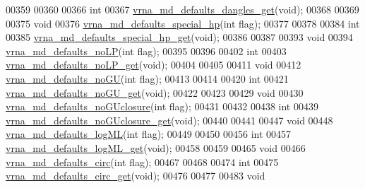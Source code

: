 \begin{DoxyCode}
00359 
00360 
00366 \textcolor{keywordtype}{int}
00367 \mbox{\hyperlink{group__model__details_ga67ca06f95ae133778c79a4493c9817b8}{vrna\_md\_defaults\_dangles\_get}}(\textcolor{keywordtype}{void});
00368 
00369 
00375 \textcolor{keywordtype}{void}
00376 \mbox{\hyperlink{group__model__details_gafff6449a02744add0308e653230c15fc}{vrna\_md\_defaults\_special\_hp}}(\textcolor{keywordtype}{int} flag);
00377 
00378 
00384 \textcolor{keywordtype}{int}
00385 \mbox{\hyperlink{group__model__details_ga1d68a6efdaa1253cc63fd9cd06452559}{vrna\_md\_defaults\_special\_hp\_get}}(\textcolor{keywordtype}{void});
00386 
00387 
00393 \textcolor{keywordtype}{void}
00394 \mbox{\hyperlink{group__model__details_ga2f88ffc393ac9d7987849c965fd29ea8}{vrna\_md\_defaults\_noLP}}(\textcolor{keywordtype}{int} flag);
00395 
00396 
00402 \textcolor{keywordtype}{int}
00403 \mbox{\hyperlink{group__model__details_ga934344888fbacaed538bbbfe910f2aa6}{vrna\_md\_defaults\_noLP\_get}}(\textcolor{keywordtype}{void});
00404 
00405 
00411 \textcolor{keywordtype}{void}
00412 \mbox{\hyperlink{group__model__details_ga98218f85c7a957a1d1ddf4627fdf5a39}{vrna\_md\_defaults\_noGU}}(\textcolor{keywordtype}{int} flag);
00413 
00414 
00420 \textcolor{keywordtype}{int}
00421 \mbox{\hyperlink{group__model__details_ga5faa7d4e536d7fe36ec25428c0cf2563}{vrna\_md\_defaults\_noGU\_get}}(\textcolor{keywordtype}{void});
00422 
00423 
00429 \textcolor{keywordtype}{void}
00430 \mbox{\hyperlink{group__model__details_gade5b9951d71ca2fb357a4e6c0c18ccd1}{vrna\_md\_defaults\_noGUclosure}}(\textcolor{keywordtype}{int} flag);
00431 
00432 
00438 \textcolor{keywordtype}{int}
00439 \mbox{\hyperlink{group__model__details_ga4f7fdad083243a5348d63320ddaa70f3}{vrna\_md\_defaults\_noGUclosure\_get}}(\textcolor{keywordtype}{void});
00440 
00441 
00447 \textcolor{keywordtype}{void}
00448 \mbox{\hyperlink{group__model__details_ga3de50a73455d88c3957386933b8e1f90}{vrna\_md\_defaults\_logML}}(\textcolor{keywordtype}{int} flag);
00449 
00450 
00456 \textcolor{keywordtype}{int}
00457 \mbox{\hyperlink{group__model__details_ga93f04e070d529c5d0bb87c9681f6ad29}{vrna\_md\_defaults\_logML\_get}}(\textcolor{keywordtype}{void});
00458 
00459 
00465 \textcolor{keywordtype}{void}
00466 \mbox{\hyperlink{group__model__details_ga4e1deb3e91a8a99e5c6dd905a5eb0186}{vrna\_md\_defaults\_circ}}(\textcolor{keywordtype}{int} flag);
00467 
00468 
00474 \textcolor{keywordtype}{int}
00475 \mbox{\hyperlink{group__model__details_gad3a7e58de344ad93a08925f58f94f6fb}{vrna\_md\_defaults\_circ\_get}}(\textcolor{keywordtype}{void});
00476 
00477 
00483 \textcolor{keywordtype}{void}

\end{DoxyCode}
